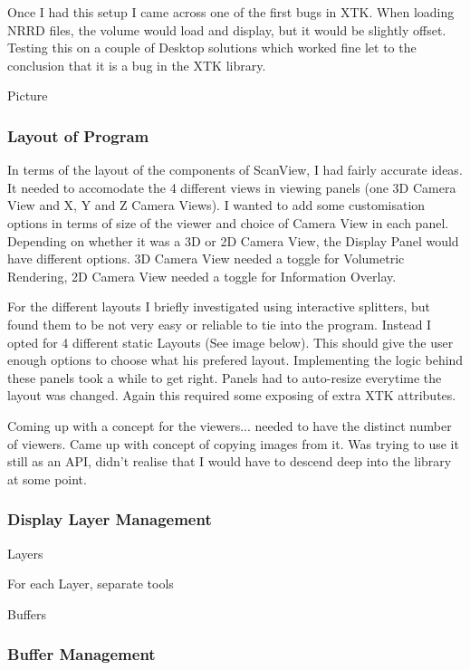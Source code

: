 \documentclass[a4paper,11pt,titlepage]{article}
\begin{document}
Once I had this setup I came across one of the first bugs in XTK. When loading NRRD files, the volume would load and display, but it would be slightly offset. Testing this on a couple of Desktop solutions which worked fine let to the conclusion that it is a bug in the XTK library. 

Picture



\subsubsection{Layout of Program}

In terms of the layout of the components of ScanView, I had fairly accurate ideas. It needed to accomodate the 4 different views in viewing panels (one 3D Camera View and X, Y and Z Camera Views). I wanted to add some customisation options in terms of size of the viewer and choice of Camera View in each panel. Depending on whether it was a 3D or 2D Camera View, the Display Panel would have different options. 3D Camera View needed a toggle for Volumetric Rendering, 2D Camera View needed a toggle for Information Overlay.

For the different layouts I briefly investigated using interactive splitters, but found them to be not very easy or reliable to tie into the program. Instead I opted for 4 different static Layouts (See image below). This should give the user enough options to choose what his prefered layout. Implementing the logic behind these panels took a while to get right. Panels had to auto-resize everytime the layout was changed. Again this required some exposing of extra XTK attributes.

Coming up with a concept for the viewers... needed to have the distinct number of viewers.
Came up with concept of copying images from it.
Was trying to use it still as an API, didn't realise that I would have to descend deep into the library at some point.



\subsubsection{Display Layer Management}

Layers

For each Layer, separate tools

Buffers

\subsubsection{Buffer Management}
\end{document}
